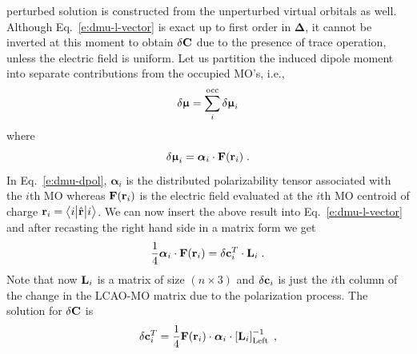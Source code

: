 \documentclass[aip,amsmath,amssymb,reprint]{revtex4-1}
\newcommand{\tbraket}[3]{\ensuremath{\bigl\langle {#1} \bigl\lvert {#2} \bigl\lvert {#3} \bigr\rangle}}
\newcommand{\BM}[1]{\bm{#1}}
\begin{document}
perturbed solution is constructed from the unperturbed virtual orbitals as well.
Although Eq.~\eqref{e:dmu-l-vector}
is exact up to first order in ${\BM\Delta}$, it cannot be inverted at this moment to obtain $\delta {\bf C}$
due to the presence of trace operation, unless the electric field is uniform.
Let us partition the induced dipole moment into separate contributions
from the occupied MO's, i.e.,
%
\begin{equation} \label{e:dmu-part}
 \delta {\BM{\upmu}} = \sum_i^{\rm occ} \delta {\BM{\upmu}}_i
\end{equation}
%
where
%
\begin{equation} \label{e:dmu-dpol}
 \delta {\BM{\upmu}}_i = {\BM{\alpha}}_i \cdot {\bf F}({\bf r}_i) \;.
\end{equation}
%
In Eq.~\eqref{e:dmu-dpol}, ${\BM{\alpha}}_i$ is the distributed polarizability tensor
associated with the $i$th MO whereas ${\bf F}({\bf r}_i)$ is the electric field evaluated at the $i$th MO centroid of charge
${\bf r}_i = \tbraket{i}{\hat{\bf r}}{i}$.
We can now insert the above result into Eq.~\eqref{e:dmu-l-vector} 
and after recasting the right hand side in a matrix form
we get
%
\begin{equation} \label{e:dmu-l-vector-mo-transform-X}
 \frac{1}{4} {\BM{\alpha}}_i \cdot {\bf F}({\bf r}_i) 
   =
   \delta {\bf c}_i^T \cdot {\bf L}_i \;.
\end{equation}
%
Note that now ${\bf L}_i$ is a matrix of size $(n \times 3)$ and $\delta{\bf c}_i$ is just the $i$th column of the
change in the LCAO-MO matrix due to the polarization process.
%
%
The solution for $\delta {\bf C}$ is
%
\begin{equation} \label{e:mu-ind.matrix.linear.solution}
  \delta {\bf c}_i^T = \frac{1}{4}
            {\bf F}({\bf r}_i)  \cdot {\BM{\alpha}}_i \cdot 
                    \left[ {\bf L}_i  \right]^{-1}_{\rm Left} \;,
\end{equation}
\end{document}
